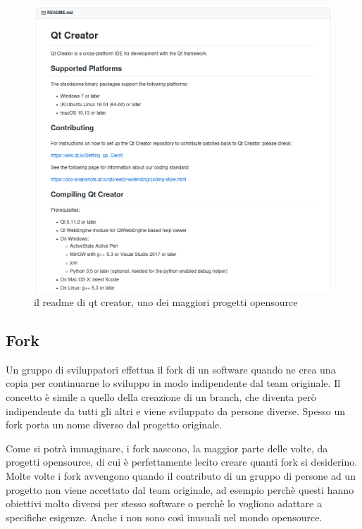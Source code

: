 \documentclass{article}
\begin{document}
\begin{figure}
\includegraphics[width=6in]{img/readme.png}
\centering
\caption{il readme di qt creator, uno dei maggiori progetti opensource 
}
\end{figure}

\subsection{Fork\label{fork}}
Un gruppo di sviluppatori effettua il fork di un software quando ne crea una
copia per continuarne lo sviluppo in modo indipendente dal team originale.
Il concetto è simile a quello della creazione di un branch, che diventa però
indipendente da tutti gli altri e viene sviluppato da persone diverse.
Spesso un fork porta un nome diverso dal progetto originale.

Come si potrà immaginare, i fork nascono, la maggior parte delle volte, da progetti
opensource, di cui è perfettamente lecito creare quanti fork si desiderino.
Molte volte i fork avvengono quando il contributo di un gruppo di persone ad un
progetto non viene accettato dal team originale, ad esempio perchè questi
hanno obiettivi molto diversi per stesso software o perchè lo vogliono adattare
a specifiche esigenze.
Anche i 
non sono così inusuali nel mondo opensource.
\end{document}
